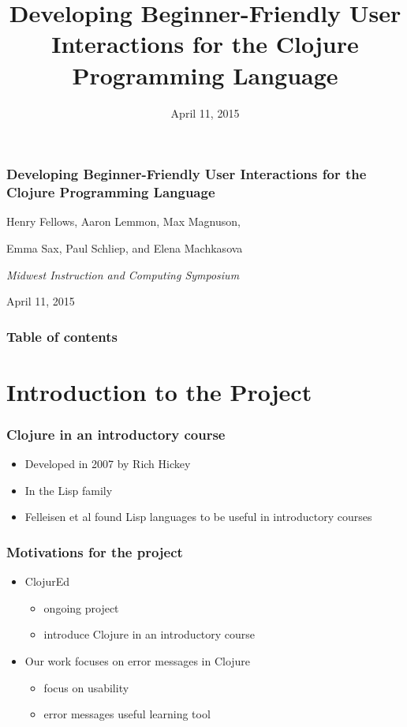 \documentclass{beamer}
\begin{document}
\title{Developing Beginner-Friendly User Interactions for the Clojure Programming Language}
\date{April 11, 2015}

\begin{frame}
\frametitle{Developing Beginner-Friendly User Interactions for the Clojure Programming Language}
{\centering
\noindent
Henry Fellows, Aaron Lemmon, Max Magnuson, \par
Emma Sax, Paul Schliep, and Elena Machkasova \par

{\it 
Midwest Instruction and Computing Symposium\par
April 11, 2015\par}
}
\end{frame}

\begin{frame}
\frametitle{Table of contents}
\tableofcontents  
\end{frame}

\section{Introduction to the Project}
\begin{frame}
	\frametitle{Clojure in an introductory course}
	\begin{itemize}
		\item Developed in 2007 by Rich Hickey
		\item In the Lisp family
		\item Felleisen et al found Lisp languages to be useful in introductory courses
	\end{itemize}
\end{frame}

\begin{frame}
\frametitle{Motivations for the project}
	\begin{itemize}
		\item ClojurEd
			\begin{itemize}
				\item ongoing project
				\item introduce Clojure in an introductory course
			\end{itemize}
		\item Our work focuses on error messages in Clojure
			\begin{itemize}
				\item focus on usability
				\item error messages useful learning tool
			\end{itemize}
	\end{itemize}
\end{frame}
\end{document}
